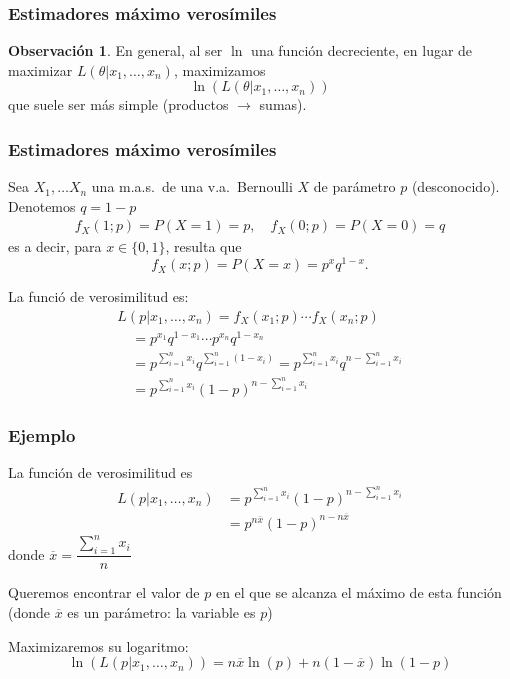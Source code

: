 \documentclass[12pt,t]{beamer}
\theoremstyle{plain}
\theoremstyle{definition}
\newtheorem{obs}{Observación}
\begin{document}
\begin{frame}
\frametitle{Estimadores máximo verosímiles }

\vspace{1cm}

\begin{obs}
En general, al ser $\ln$  una función decreciente, en lugar de maximizar $L(\theta|x_1,\ldots,x_n)$, maximizamos
$$
\ln(L(\theta|x_1,\ldots,x_n))
$$
que suele ser más simple (productos $\to$ sumas).
\end{obs}
\end{frame}


\begin{frame}
\frametitle{Estimadores máximo verosímiles}
Sea $X_{1},\ldots X_{n}$ una m.a.s.\ de una v.a.\ Bernoulli $X$ de parámetro  $p$ (desconocido). Denotemos $q=1-p$
$$
\begin{array}{c}
f_X(1;p)=P(X=1)=p,\quad 
f_X(0;p)=P(X=0)=q
\end{array}
$$
es a decir, para $x\in\{0,1\}$, resulta que 
$$f_X(x;p)=P(X=x)=p^{x} q^{1-x}.$$

La funció de verosimilitud es:
$$
\begin{array}{l}
L(p|x_1,\ldots,x_n) = f_{X}(x_1;p)\cdots f_{X}(x_n;p)\\[1ex]
\quad =
p^{x_{1}}q^{1-x_{1}} \cdots  p^{x_{n}}q^{1-x_{n}}
\\[1ex]
\quad = p^{\sum_{i=1}^n x_{i}} q^{\sum_{i=1}^n (1-x_{i})}= p^{\sum_{i=1}^n x_{i}} q^{n-\sum_{i=1}^n x_{i}}\\[1ex]
\quad =p^{\sum_{i=1}^n x_{i}} (1-p)^{n-\sum_{i=1}^n x_{i}}
\end{array}
$$
\end{frame}

\begin{frame}
\frametitle{Ejemplo}
La función de verosimilitud es
$$
\begin{array}{rl}
L(p|x_1,\ldots,x_n) & =p^{\sum_{i=1}^n x_{i}} (1-p)^{n-\sum_{i=1}^n x_{i}}\\
& =p^{n\overline{x}}(1-p)^{n-n\overline{x}}
\end{array}
$$
donde $\overline{x}=\dfrac{\sum_{i=1}^n x_{i}}{n}$
\medskip


Queremos encontrar el valor de $p$ en el que se alcanza el máximo de esta función (donde $\overline{x}$ es un parámetro: la variable es $p$)
\medskip

Maximizaremos su logaritmo:
$$
\ln(L(p|x_1,\ldots,x_n))=n\overline{x}\ln(p)+n(1-\overline{x})\ln(1-p)
$$
\end{frame}
\end{document}
